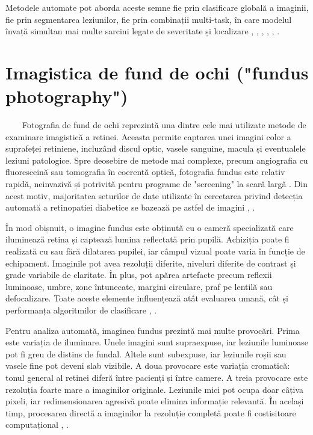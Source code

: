 \documentclass[12pt, a4paper, twoside, romanian]{teza-upb}
\begin{document}
Metodele automate pot aborda aceste semne fie prin clasificare globală a imaginii,
fie prin segmentarea leziunilor, fie prin combinații multi-task, în care modelul învață
simultan mai multe sarcini legate de severitate și localizare
\cite{1_niemeijer2005automatic}, \cite{2_sopharak2009automatic}, \cite{16_giancardo2012exudate}, \cite{18_wong2016diabetic}, \cite{6_wang2021deep}, \cite{7_huang2022rtnet}.

\section{Imagistica de fund de ochi ("fundus photography")}

\ \ \ \ Fotografia de fund de ochi reprezintă una dintre cele mai utilizate metode
de examinare imagistică a retinei. Aceasta permite captarea unei imagini color a
suprafeței retiniene, incluzând discul optic, vasele sanguine, macula și eventualele leziuni patologice.
Spre deosebire de metode mai complexe, precum angiografia cu fluoresceină sau tomografia
în coerență optică, fotografia fundus este relativ rapidă, neinvazivă și potrivită pentru
programe de "screening" la scară largă \cite{3_gulshan2016development}. Din acest motiv, majoritatea seturilor
de date utilizate în cercetarea privind detecția automată a retinopatiei diabetice se
bazează pe astfel de imagini \cite{9_chetoui2020explainable}, \cite{14_liu2022deepdrid}.
\bigskip

În mod obișnuit, o imagine fundus este obținută cu o cameră specializată
care iluminează retina și captează lumina reflectată prin pupilă. Achiziția poate fi
realizată cu sau fără dilatarea pupilei, iar câmpul vizual poate varia în
funcție de echipament. Imaginile pot avea rezoluții diferite, niveluri diferite de contrast
și grade variabile de claritate. În plus, pot apărea artefacte precum reflexii
luminoase, umbre, zone întunecate, margini circulare, praf pe lentilă sau defocalizare. Toate
aceste elemente influențează atât evaluarea umană, cât și performanța algoritmilor de clasificare
\cite{14_liu2022deepdrid}, \cite{8_zhang2022multi}.
\bigskip

Pentru analiza automată, imaginea fundus prezintă mai multe provocări. Prima este variația
de iluminare. Unele imagini sunt supraexpuse, iar leziunile luminoase pot fi greu
de distins de fundal. Altele sunt subexpuse, iar leziunile roșii sau vasele
fine pot deveni slab vizibile. A doua provocare este variația cromatică: tonul
general al retinei diferă între pacienți și între camere. A treia provocare
este rezoluția foarte mare a imaginilor originale. Leziunile mici pot ocupa doar
câțiva pixeli, iar redimensionarea agresivă poate elimina informație relevantă. În același timp,
procesarea directă a imaginilor la rezoluție completă poate fi costisitoare computațional
\cite{3_gulshan2016development}, \cite{11_shakibania2024dual}.
\bigskip
\end{document}
